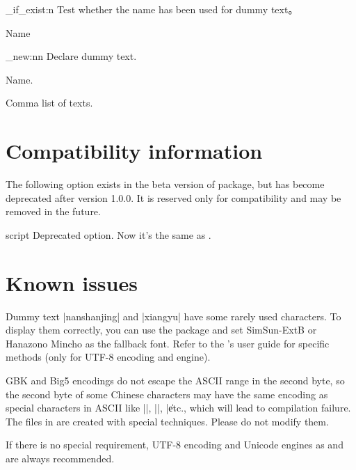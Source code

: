 \documentclass{ctxdoc}
\begin{document}
\begin{function}[TF]{\zhlipsum_if_exist:n}
  Test whether the name has been used for dummy text。
  \begin{arguments}
    \item Name
  \end{arguments}
\end{function}

\begin{function}{\zhlipsum_new:nn}
  Declare dummy text.
  \begin{arguments}
    \item Name.
    \item Comma list of texts.
  \end{arguments}
\end{function}

\section{Compatibility information}

The following option exists in the beta version of 
package, but has become deprecated after version 1.0.0. It is
reserved only for compatibility and may be removed in the future.

\begin{function}{script}
  Deprecated option. Now it's the same as .
\end{function}

\section{Known issues}

Dummy text |nanshanjing| and |xiangyu| have some rarely used
characters. To display them correctly, you can use the 
package and set SimSun-ExtB or Hanazono Mincho as the fallback
font. Refer to the 's user guide for specific methods
(only for UTF-8 encoding and \XeLaTeX{} engine).

GBK and Big5 encodings do not escape the ASCII range in the
second byte, so the second byte of some Chinese characters may
have the same encoding as special characters in ASCII like |{|,
|}|, |\| etc., which will lead to compilation failure. The
 files in  are created with special
techniques. Please do not modify them.

If there is no special requirement, UTF-8 encoding and Unicode
engines as \XeLaTeX{} and \LuaLaTeX{} are always recommended.
\end{document}
